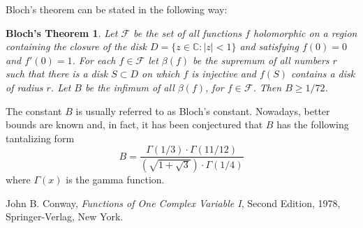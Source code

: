 \documentclass[12pt]{article}
\newtheorem*{thmnn}{Bloch's Theorem}
\theoremstyle{definition}
\begin{document}
Bloch's theorem can be stated in the following way:

\begin{thmnn} Let $\mathcal{F}$ be the set of all functions $f$ holomorphic on a region containing the
closure of the disk $D=\{z\in\mathbb{C}:|z|<1\}$ and satisfying
$f(0)=0$ and $f'(0)=1$. For each $f\in\mathcal{F}$ let $\beta(f)$
be the supremum of all numbers $r$ such that there is a disk
$S\subset D$ on which $f$ is injective and $f(S)$ contains a disk
of radius $r$. Let $B$ be the infimum of all $\beta(f)$, for $f\in
\mathcal{F}$. Then $B\geq 1/72$.
\end{thmnn}

The constant $B$ is usually referred to as Bloch's constant.
Nowadays, better bounds are known and, in fact, it has been
conjectured that $B$ has the following tantalizing form
$$B=\frac{\Gamma(1/3)\cdot \Gamma(11/12)}{\left(\sqrt{1+\sqrt{3}}\right)\cdot \Gamma(1/4)}$$
where $\Gamma(x)$ is the gamma function.

\begin{thebibliography}{00}

 John B. Conway, {\em Functions of One Complex
Variable I}, Second Edition, 1978, Springer-Verlag, New York.

\end{thebibliography}
\end{document}
